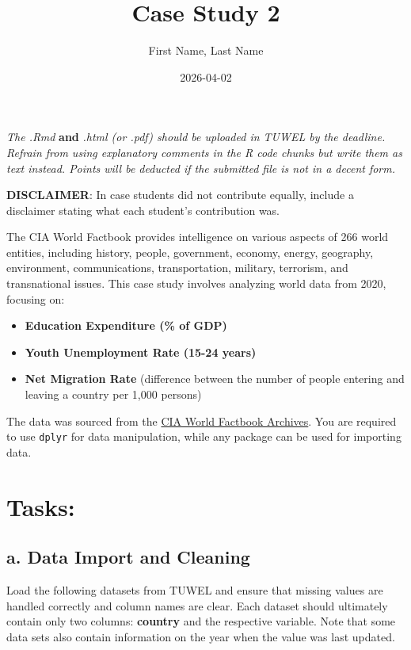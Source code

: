 \documentclass[
]{article}
\title{Case Study 2}
\author{First Name, Last Name}
\date{2026-04-02}
\providecommand{\tightlist}{%
  \setlength{\itemsep}{0pt}\setlength{\parskip}{0pt}}
\begin{document}
\maketitle

\emph{The .Rmd} \textbf{and} \emph{.html (or .pdf) should be uploaded in
TUWEL by the deadline. Refrain from using explanatory comments in the R
code chunks but write them as text instead. Points will be deducted if
the submitted file is not in a decent form.}

\textbf{DISCLAIMER}: In case students did not contribute equally,
include a disclaimer stating what each student's contribution was.

The CIA World Factbook provides intelligence on various aspects of 266
world entities, including history, people, government, economy, energy,
geography, environment, communications, transportation, military,
terrorism, and transnational issues. This case study involves analyzing
world data from 2020, focusing on:

\begin{itemize}
\tightlist
\item
  \textbf{Education Expenditure (\% of GDP)}
\item
  \textbf{Youth Unemployment Rate (15-24 years)}
\item
  \textbf{Net Migration Rate} (difference between the number of people
  entering and leaving a country per 1,000 persons)
\end{itemize}

The data was sourced from the
\href{https://www.cia.gov/the-world-factbook/about/archives/}{CIA World
Factbook Archives}. You are required to use \texttt{dplyr} for data
manipulation, while any package can be used for importing data.

\section{Tasks:}\label{tasks}

\subsection{a. Data Import and
Cleaning}\label{a.-data-import-and-cleaning}

Load the following datasets from TUWEL and ensure that missing values
are handled correctly and column names are clear. Each dataset should
ultimately contain only two columns: \textbf{country} and the respective
variable. Note that some data sets also contain information on the year
when the value was last updated.
\end{document}
